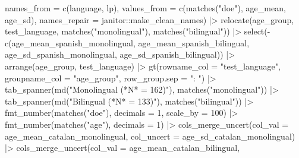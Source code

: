 \documentclass[
  letterpaper,
  DIV=11,
  numbers=noendperiod]{scrartcl}
\newenvironment{Shaded}{\begin{snugshade}}{\end{snugshade}}
\newcommand{\AttributeTok}[1]{\textcolor[rgb]{0.40,0.45,0.13}{#1}}
\newcommand{\DecValTok}[1]{\textcolor[rgb]{0.68,0.00,0.00}{#1}}
\newcommand{\FunctionTok}[1]{\textcolor[rgb]{0.28,0.35,0.67}{#1}}
\newcommand{\NormalTok}[1]{\textcolor[rgb]{0.00,0.23,0.31}{#1}}
\newcommand{\SpecialCharTok}[1]{\textcolor[rgb]{0.37,0.37,0.37}{#1}}
\newcommand{\StringTok}[1]{\textcolor[rgb]{0.13,0.47,0.30}{#1}}
\begin{document}
\begin{Shaded}
\begin{Highlighting}[]
                \AttributeTok{names\_from =} \FunctionTok{c}\NormalTok{(language, lp),}
                \AttributeTok{values\_from =} \FunctionTok{c}\NormalTok{(}\FunctionTok{matches}\NormalTok{(}\StringTok{"doe"}\NormalTok{), age\_mean, age\_sd),}
                \AttributeTok{names\_repair =}\NormalTok{ janitor}\SpecialCharTok{::}\NormalTok{make\_clean\_names) }\SpecialCharTok{|\textgreater{}} 
    \FunctionTok{relocate}\NormalTok{(age\_group, test\_language,}
             \FunctionTok{matches}\NormalTok{(}\StringTok{"monolingual"}\NormalTok{),}
             \FunctionTok{matches}\NormalTok{(}\StringTok{"bilingual"}\NormalTok{)) }\SpecialCharTok{|\textgreater{}} 
    \FunctionTok{select}\NormalTok{(}\SpecialCharTok{{-}}\FunctionTok{c}\NormalTok{(age\_mean\_spanish\_monolingual,}
\NormalTok{              age\_mean\_spanish\_bilingual,}
\NormalTok{              age\_sd\_spanish\_monolingual,}
\NormalTok{              age\_sd\_spanish\_bilingual)) }\SpecialCharTok{|\textgreater{}} 
    \FunctionTok{arrange}\NormalTok{(age\_group, test\_language) }\SpecialCharTok{|\textgreater{}} 
    \FunctionTok{gt}\NormalTok{(}\AttributeTok{rowname\_col =} \StringTok{"test\_language"}\NormalTok{, }
       \AttributeTok{groupname\_col =} \StringTok{"age\_group"}\NormalTok{, }
       \AttributeTok{row\_group.sep =} \StringTok{": "}\NormalTok{) }\SpecialCharTok{|\textgreater{}} 
    \FunctionTok{tab\_spanner}\NormalTok{(}\FunctionTok{md}\NormalTok{(}\StringTok{"Monolingual (*N* = 162)"}\NormalTok{), }\FunctionTok{matches}\NormalTok{(}\StringTok{"monolingual"}\NormalTok{)) }\SpecialCharTok{|\textgreater{}} 
    \FunctionTok{tab\_spanner}\NormalTok{(}\FunctionTok{md}\NormalTok{(}\StringTok{"Bilingual (*N* = 133)"}\NormalTok{), }\FunctionTok{matches}\NormalTok{(}\StringTok{"bilingual"}\NormalTok{)) }\SpecialCharTok{|\textgreater{}}
    \FunctionTok{fmt\_number}\NormalTok{(}\FunctionTok{matches}\NormalTok{(}\StringTok{"doe"}\NormalTok{), }\AttributeTok{decimals =} \DecValTok{1}\NormalTok{, }\AttributeTok{scale\_by =} \DecValTok{100}\NormalTok{) }\SpecialCharTok{|\textgreater{}} 
    \FunctionTok{fmt\_number}\NormalTok{(}\FunctionTok{matches}\NormalTok{(}\StringTok{"age"}\NormalTok{), }\AttributeTok{decimals =} \DecValTok{1}\NormalTok{) }\SpecialCharTok{|\textgreater{}} 
    \FunctionTok{cols\_merge\_uncert}\NormalTok{(}\AttributeTok{col\_val =}\NormalTok{ age\_mean\_catalan\_monolingual, }
                      \AttributeTok{col\_uncert =}\NormalTok{ age\_sd\_catalan\_monolingual) }\SpecialCharTok{|\textgreater{}} 
    \FunctionTok{cols\_merge\_uncert}\NormalTok{(}\AttributeTok{col\_val =}\NormalTok{ age\_mean\_catalan\_bilingual, }

\end{Highlighting}
\end{Shaded}
\end{document}
